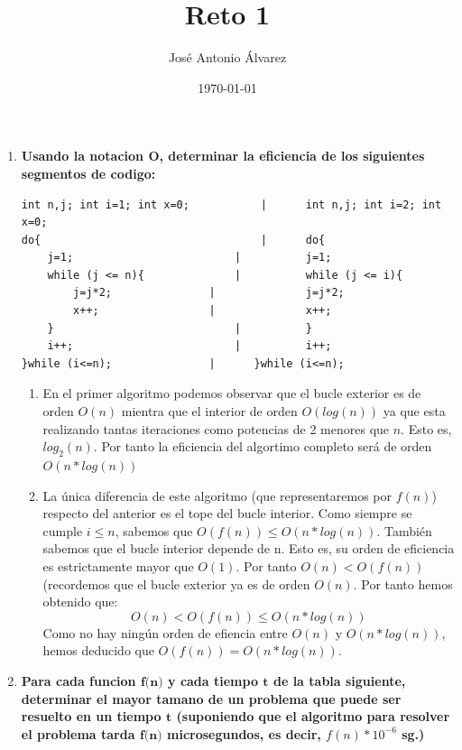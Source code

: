 \documentclass[11pt,a4paper]{article}
\title{Reto 1}
\author{José Antonio Álvarez}
\date{\today}
\begin{document}
\maketitle
\begin{enumerate}
\item \large{\textbf{Usando la notacion O, determinar la eficiencia de los siguientes segmentos de codigo:}} \\

\begin{lstlisting}
int n,j; int i=1; int x=0;           |      int n,j; int i=2; int x=0;
do{                                  |      do{
	j=1;                         |      	j=1;
	while (j <= n){              |      	while (j <= i){
		j=j*2;               |      		j=j*2;
		x++;                 |      		x++;
	}                            |      	}
	i++;                         |      	i++;
}while (i<=n); 			     | 	    }while (i<=n);
\end{lstlisting}

\begin{enumerate}

\item En el primer algoritmo podemos observar que el bucle exterior es de orden $O(n)$ mientra que el interior de orden $O(log(n))$ ya que esta realizando tantas iteraciones como potencias de 2 menores que $n$. Esto es, $log_2(n)$. Por tanto la eficiencia del algortimo completo será de orden $O(n*log(n))$

\item La única diferencia de este algoritmo (que representaremos por  $f(n)$) respecto del anterior es el tope del bucle interior. Como siempre se cumple $i \leq n$, sabemos que $O(f(n)) \leq O(n*log(n))$. También sabemos que el bucle interior depende de n. Esto es, su orden de eficiencia es estrictamente mayor que $O(1)$. Por tanto $O(n) < O(f(n))$ (recordemos que el bucle exterior ya es de orden $O(n)$. Por tanto hemos obtenido que: 
$$O(n) < O(f(n)) \leq O(n*log(n))$$ 
Como no hay ningún orden de efiencia entre $O(n)$ y $O(n*log(n))$, hemos deducido que $O(f(n)) = O(n*log(n))$.

\end{enumerate}

\item \large{\textbf{Para cada funcion $\textbf{f(n)}$ y cada tiempo $\textbf{t}$ de la tabla siguiente, determinar el mayor tamano de un problema que puede ser resuelto en un tiempo $\textbf{t}$ (suponiendo que el algoritmo para resolver el problema tarda $\textbf{f(n)}$ microsegundos, es decir, $f(n)*10^{-6}$ sg.)}} \\


\end{enumerate}
\end{document}
